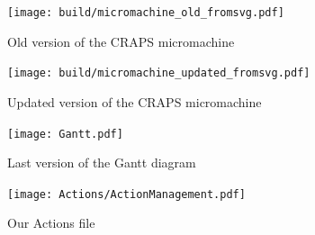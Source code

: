 \documentclass[openany, a4paper]{book}
\begin{document}
    \begin{figure}
      \centering
      \texttt{[image: build/micromachine\_old\_fromsvg.pdf]}
      \caption{Old version of the CRAPS micromachine}
    \end{figure}

    \begin{figure}
      \centering
      \texttt{[image: build/micromachine\_updated\_fromsvg.pdf]}
      \caption{Updated version of the CRAPS micromachine}
    \end{figure}

    \begin{figure}
      \centering
      \texttt{[image: Gantt.pdf]}
      \caption{Last version of the Gantt diagram}\label{fig:gantt}
    \end{figure}

    \begin{figure}
        \centering
        \texttt{[image: Actions/ActionManagement.pdf]}
        \caption{Our Actions file}\label{ActionFile}
    \end{figure}
\end{document}
